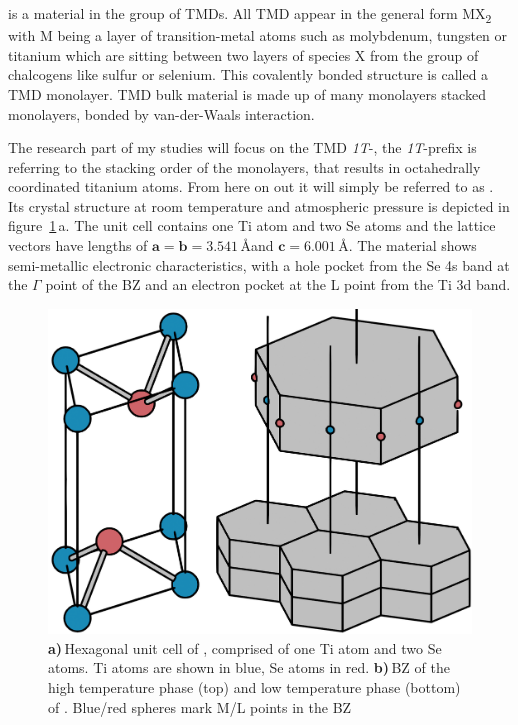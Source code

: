 \ts\space is a material in the group of \acp{TMD}.
All \ac{TMD} appear in the general form MX\textsubscript{2} with M being a layer of transition-metal atoms such as molybdenum, tungsten or titanium which are sitting between two layers of species X from the group of chalcogens like sulfur or selenium.
This covalently bonded structure is called a \ac{TMD} monolayer.
\Ac{TMD} bulk material is made up of many monolayers stacked monolayers, bonded by van-der-Waals interaction.

The research part of my studies will focus on the \ac{TMD} \textit{1T}-\ts, the \textit{1T}-prefix is referring to the stacking order of the monolayers, that results in octahedrally coordinated titanium atoms.
From here on out it will simply be referred to as \ts.
Its crystal structure at room temperature and atmospheric pressure is depicted in figure~\ref{fig:crystal}\,a.
The unit cell contains one Ti atom and two Se atoms and the lattice vectors have lengths of $\mathbf{a}=\mathbf{b}=3.541$\,\AA\space and $\mathbf{c}=6.001$\,\AA\cite{patel1983}.
The material shows semi-metallic electronic characteristics\cite{bachrach1976}, with a hole pocket from the Se 4s band at the $\Gamma$ point of the \ac{BZ} and an electron pocket at the L point from the Ti 3d band\cite{zunger1978}.

\begin{figure}[!t]
	\begin{minipage}{0.5\columnwidth}
		\includegraphics[width=\columnwidth]{figs/tise2_crystal.png}
	\end{minipage}
	\hspace{0.04\columnwidth}
	\begin{minipage}{0.45\columnwidth}
		\caption{\textbf{a)}\,Hexagonal unit cell of \ts, comprised of one Ti atom and two Se atoms. Ti atoms are shown in blue, Se atoms in red. \textbf{b)}\,\ac{BZ} of the high temperature phase (top) and low temperature phase (bottom) of \ts. Blue/red spheres mark M/L points in the \ac{BZ}}
		\label{fig:crystal}
	\end{minipage}
\end{figure}

